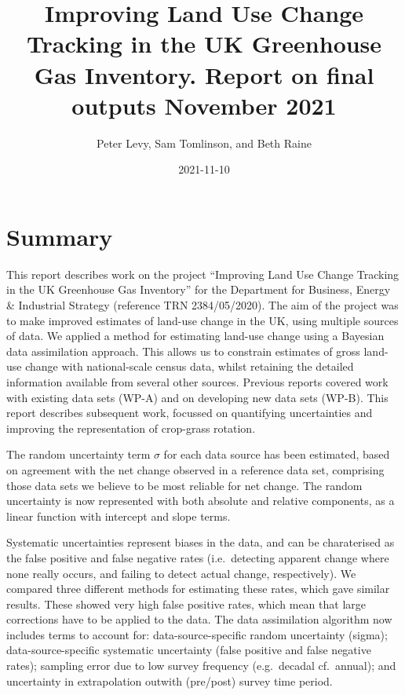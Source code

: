 \documentclass[
]{book}
\title{Improving Land Use Change Tracking in the UK Greenhouse Gas Inventory. Report on final outputs November 2021}
\author{Peter Levy, Sam Tomlinson, and Beth Raine}
\date{2021-11-10}
\begin{document}
\maketitle

{
\setcounter{tocdepth}{1}
\tableofcontents
}
\hypertarget{summary}{%
\chapter*{Summary}\label{summary}}

This report describes work on the project ``Improving Land Use Change Tracking in the UK Greenhouse Gas Inventory'' for the Department for Business, Energy \& Industrial Strategy (reference TRN 2384/05/2020). The aim of the project was to make improved estimates of land-use change in the UK, using multiple sources of data. We applied a method for estimating land-use change using a Bayesian data assimilation approach. This allows us to constrain estimates of gross land-use change with national-scale census data, whilst retaining the detailed information available from several other sources. Previous reports covered work with existing data sets (WP-A) and on developing new data sets (WP-B). This report describes subsequent work, focussed on quantifying uncertainties and improving the representation of crop-grass rotation.

The random uncertainty term \(\sigma\) for each data source has been estimated, based on agreement with the net change observed in a reference data set, comprising those data sets we believe to be most reliable for net change. The random uncertainty is now represented with both absolute and relative components, as a linear function with intercept and slope terms.

Systematic uncertainties represent biases in the data, and can be charaterised as the false positive and false negative rates (i.e.~detecting apparent change where none really occurs, and failing to detect actual change, respectively). We compared three different methods for estimating these rates, which gave similar results. These showed very high false positive rates, which mean that large corrections have to be applied to the data. The data assimilation algorithm now includes terms to account for: data-source-specific random uncertainty (sigma); data-source-specific systematic uncertainty (false positive and false negative rates); sampling error due to low survey frequency (e.g.~decadal cf.~annual); and uncertainty in extrapolation outwith (pre/post) survey time period.
\end{document}
